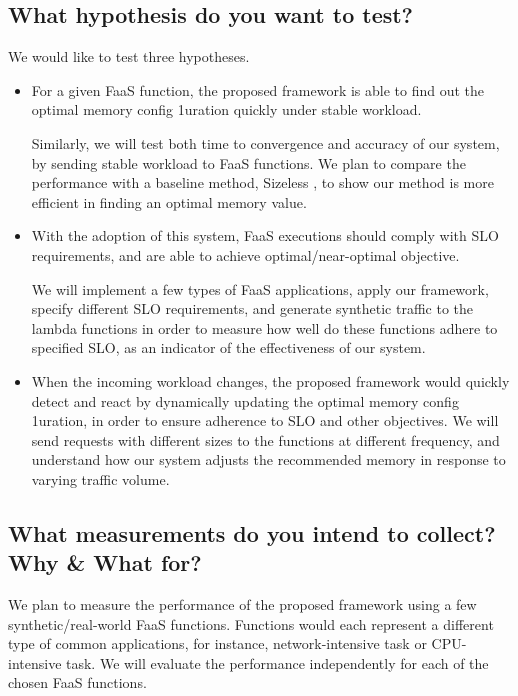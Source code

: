 \documentclass[conference]{IEEEtran}
\begin{document}
\subsection{What hypothesis do you want to test?}
We would like to test three hypotheses.
\begin{itemize}
\item For a given FaaS function, the proposed framework is able to find out the optimal memory config 1uration quickly under stable workload.

Similarly, we will test both time to convergence and accuracy of our system, by sending stable workload to FaaS functions. We plan to compare the performance with a baseline method, Sizeless \cite{10.1145/3464298.3493398}, to show our method is more efficient in finding an optimal memory value.


\item With the adoption of this system, FaaS executions should comply with SLO requirements, and are able to achieve optimal/near-optimal objective.

We will implement a few types of FaaS applications, apply our framework, specify different SLO requirements, and generate synthetic traffic to the lambda functions in order to measure how well do these functions adhere to specified SLO, as an indicator of the effectiveness of our system.

\item When the incoming workload changes, the proposed framework would quickly detect and react by dynamically updating the optimal memory config 1uration, in order to ensure adherence to SLO and other objectives.
We will send requests with different sizes to the functions at different frequency, and understand how our system adjusts the recommended memory in response to varying traffic volume.
\end{itemize}

\subsection{What measurements do you intend to collect? Why \& What for?}

We plan to measure the performance of the proposed framework using a few synthetic/real-world FaaS functions. Functions would each represent a different type of common applications, for instance, network-intensive task or CPU-intensive task. We will evaluate the performance independently for each of the chosen FaaS functions. 
\end{document}
